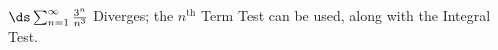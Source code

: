 {$\ds \sum_{n=1}^\infty \frac{3^n}{n^3}$
}
{Diverges; the $n^\text{th}$ Term Test can be used, along with the Integral Test.
}